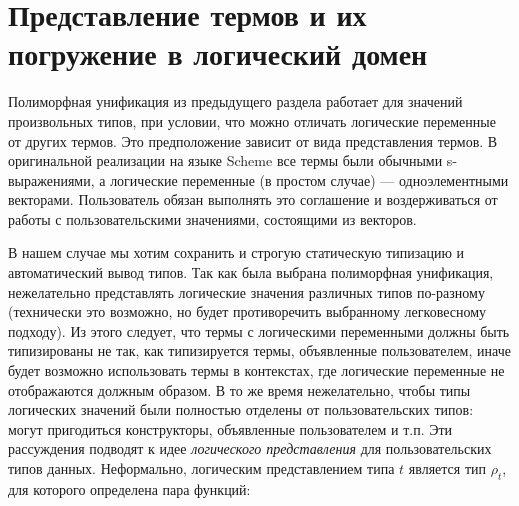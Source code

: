 
\section{Представление термов и их погружение в логический домен}
\label{sec:injection}

Полиморфная унификация из предыдущего раздела работает для значений произвольных типов, при условии, что можно отличать логические переменные от других термов.
Это предположение зависит  от вида представления термов.
В оригинальной реализации на языке Scheme все термы были обычными s-выражениями, а логические переменные (в простом случае) --- одноэлементными векторами.
Пользователь обязан выполнять это соглашение и воздерживаться от работы с пользовательскими значениями, состоящими из векторов.


В нашем случае мы хотим сохранить и строгую статическую типизацию и автоматический вывод типов.
Так как была выбрана полиморфная унификация, нежелательно представлять логические значения различных типов по-разному (технически это возможно, но будет противоречить выбранному легковесному подходу). Из этого следует, что термы с логическими переменными должны быть типизированы не так, как типизируется термы, объявленные пользователем, иначе будет возможно использовать термы в контекстах, где логические переменные не отображаются должным образом.
В то же время нежелательно, чтобы типы логических значений были полностью отделены от пользовательских типов: могут пригодиться конструкторы, объявленные пользователем и т.п.
Эти рассуждения подводят к идее \emph{логического представления} для пользовательских типов данных.
Неформально, логическим представлением типа $t$ является тип $\rho_t$, для которого определена пара функций:


